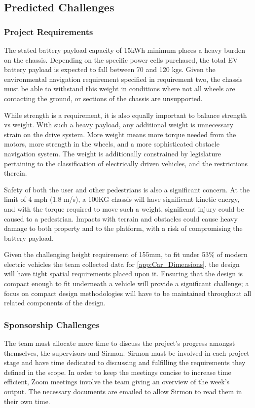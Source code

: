 \documentclass [12pt]{article}
\begin{document}
\subsection{Predicted Challenges}\label{sec:predicted_challenges}

\subsubsection{Project Requirements}
The stated battery payload capacity of 15kWh minimum places a heavy burden on the chassis. Depending on the specific power cells purchased, the total EV battery payload is expected to fall between 70 and 120 kgs. Given the environmental navigation requirement specified in requirement two, the chassis must be able to withstand this weight in conditions where not all wheels are contacting the ground, or sections of the chassis are unsupported.

While strength is a requirement, it is also equally important to balance strength vs weight. With such a heavy payload, any additional weight is unnecessary strain on the drive system. More weight means more torque needed from the motors, more strength in the wheels, and a more sophisticated obstacle navigation system. The weight is additionally constrained by legislature pertaining to the classification of electrically driven vehicles, and the restrictions therein.

Safety of both the user and other pedestrians is also a significant concern. At the limit of 4 mph (1.8 m/s), a 100KG chassis will have significant kinetic energy, and with the torque required to move such a weight, significant injury could be caused to a pedestrian. Impacts with terrain and obstacles could cause heavy damage to both property and to the platform, with a risk of compromising the battery payload.

Given the challenging height requirement of 155mm, to fit under 53\% of modern electric vehicles the team collected data for \ref{app:Car_Dimensions}, the design will have tight spatial requirements placed upon it. Ensuring that the design is compact enough to fit underneath a vehicle will provide a significant challenge; a focus on compact design methodologies will have to be maintained throughout all related components of the design.


\subsubsection{Sponsorship Challenges}
The team must allocate more time to discuss the project's progress amongst themselves, the supervisors and Sirmon. Sirmon must be involved in each project stage and have time dedicated to discussing and fulfilling the requirements they defined in the scope. In order to keep the meetings concise to increase time efficient, Zoom meetings involve the team giving an overview of the week's output. The necessary documents are emailed to allow Sirmon to read them in their own time.
\end{document}
